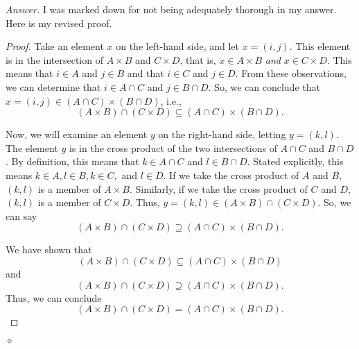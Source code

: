 \documentclass[12pt,oneside]{amsart}
\theoremstyle{remark}
\newenvironment{answer}{\bigskip\noindent\emph{Answer.}}{\hfill$\diamond$\newline}
\begin{document}
\begin{answer}
I was marked down for not being adequately thorough in my answer. Here is my revised proof.
\begin{proof}
Take an element $x$ on the left-hand side, and let $x = (i, j)$. This element is in the intersection of $A \times B$ and $C \times D$, that is, $x \in A \times B$ \emph{and} $x \in C \times D$. This means that $i \in A$ and $j \in B$ and that $i \in C$ and $j \in D$. From these observations, we can determine that $i \in A \cap C$ and $j \in B \cap D$. So, we can conclude that $x = (i, j) \in (A \cap C) \times (B \cap D)$, i.e., \[ (A \times B) \cap (C \times D) \subseteq (A \cap C) \times (B \cap D). \]

Now, we will examine an element $y$ on the right-hand side, letting $y = (k, l)$. The element $y$ is in the cross product of the two intersections of $A \cap C$ and $B \cap D$. By definition, this means that $k \in A \cap C$ and $l \in B \cap D$. Stated explicitly, this means $k \in A, l \in B, k \in C, \text{ and } l \in D$.
If we take the cross product of $A$ and $B$, $(k, l)$ is a member of $A \times B$. Similarly, if we take the cross product of $C$ and $D$, $(k, l)$ is a member of $C \times D$. Thus, $y = (k, l) \in (A \times B) \cap (C \times D)$. So, we can say \[ (A \times B) \cap (C \times D) \supseteq (A \cap C) \times (B \cap D). \]

We have shown that \[ (A \times B) \cap (C \times D) \subseteq (A \cap C) \times (B \cap D) \] and \[ (A \times B) \cap (C \times D) \supseteq (A \cap C) \times (B \cap D). \] Thus, we can conclude \[ (A \times B) \cap (C \times D) = (A \cap C) \times (B \cap D). \]
\end{proof}
\end{answer}
\end{document}
